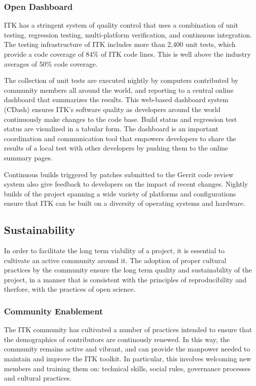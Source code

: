 \documentclass{frontiersENG} %
\begin{document}
\subsubsection{Open Dashboard} ITK has a stringent system of quality control
that uses a combination of unit testing, regression testing, multi-platform
verification, and continuous integration. The testing infrastructure of ITK
includes more than 2,400 unit tests, which provide a code coverage of 84\% of
ITK code lines. This is well above the industry averages of 50\% code coverage.

The collection of unit tests are executed nightly by computers contributed by
community members all around the world, and reporting to a central online
dashboard that summarizes the results. This web-based dashboard system (CDash)
\cite{ITKDashboard} ensures ITK’s software quality as developers around the
world continuously make changes to the code base. Build status and regression
test status are visualized in a tabular form. The dashboard is an important
coordination and communication tool that empowers developers to share the
results of a local test with other developers by pushing them to the online
summary pages.

Continuous builds triggered by patches submitted to the Gerrit code review
system also give feedback to developers on the impact of recent changes.
Nightly builds of the project spanning a wide variety of platforms and
configurations ensure that ITK can be built on a diversity of operating systems
and hardware.



\subsection{Sustainability}

In order to facilitate the long term viability of a project, it is essential to
cultivate an active community around it. The adoption of proper cultural
practices by the community ensure the long term quality and sustainability of
the project, in a manner that is consistent with the principles of
reproducibility and therfore, with the practices of open science.

\subsubsection{Community Enablement}

The ITK community has cultivated a number of practices intended to ensure that
the demographics of contributors are continously renewed. In this way, the
community remains active and vibrant, and can provide the manpower needed to
maintain and improve the ITK toolkit. In particular, this involves welcoming
new members and training them on:  technical skills, social rules, governance
processes and cultural practices.
\end{document}
